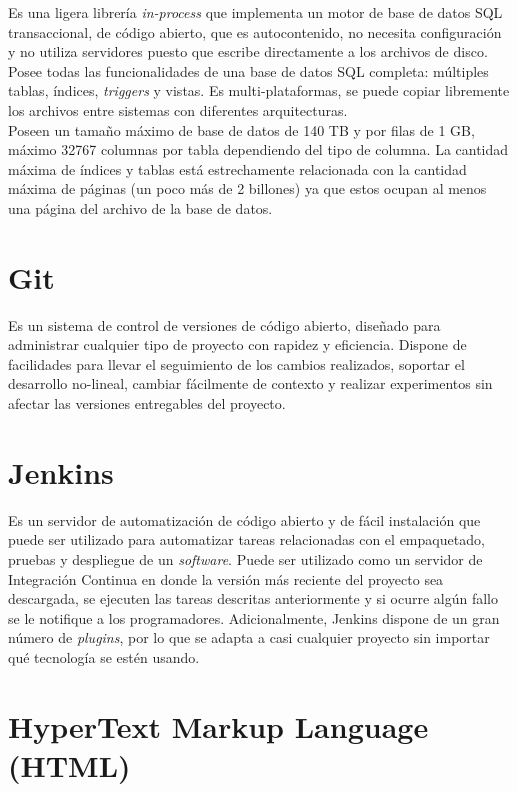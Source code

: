 Es una ligera librería \textit{in-process} que implementa un motor de base de datos SQL transaccional, de código abierto, que es autocontenido, no necesita configuración y no utiliza servidores puesto que escribe directamente a los archivos de disco. Posee todas las funcionalidades de una base de datos SQL completa: múltiples tablas, índices, \textit{triggers} y vistas.  Es multi-plataformas, se puede copiar libremente los archivos entre sistemas con diferentes arquitecturas. \\

Poseen un tamaño máximo de base de datos de 140 TB y por filas de 1 GB,  máximo 32767 columnas por tabla dependiendo del tipo de columna. La cantidad máxima de índices y tablas está estrechamente relacionada con la cantidad máxima de páginas (un poco más de 2 billones) ya que estos ocupan al menos una página del archivo de la base de datos. \cite{SQLite}

\section{Git}

Es un sistema de control de versiones de código abierto, diseñado para administrar cualquier tipo de proyecto con rapidez y eficiencia. Dispone de facilidades para llevar el seguimiento de los cambios realizados, soportar el desarrollo no-lineal, cambiar fácilmente de contexto y realizar experimentos sin afectar las versiones entregables del proyecto. \cite{Git}

\section{Jenkins}

Es un servidor de automatización de código abierto y de fácil instalación que puede ser utilizado para automatizar tareas relacionadas con el empaquetado, pruebas y despliegue de un \textit{software}. Puede ser utilizado como un servidor de Integración Continua en donde la versión más reciente del proyecto sea descargada, se ejecuten las tareas descritas anteriormente y si ocurre algún fallo se le notifique a los programadores. Adicionalmente, Jenkins dispone de un gran número de \textit{plugins}, por lo que se adapta a casi cualquier proyecto sin importar qué tecnología se estén usando. \cite{Jenkins}

\section{HyperText Markup Language (HTML)}

